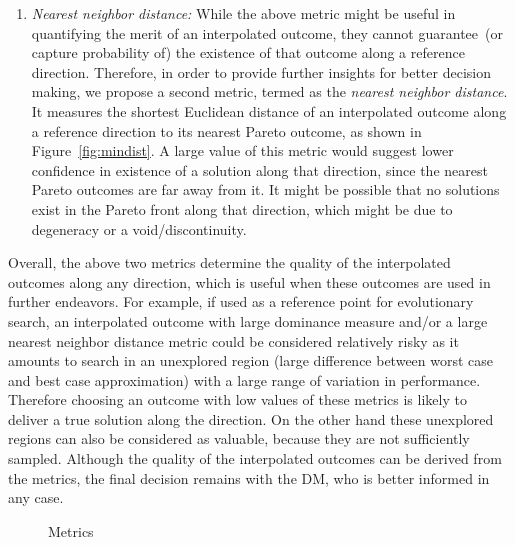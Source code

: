 {\begin{enumerate}
		
		\item \emph{Nearest neighbor distance:} While the above metric might be useful in quantifying the merit of an interpolated outcome, they cannot guarantee~(or capture probability of) the existence of that outcome along a reference direction. Therefore, in order to provide further insights for better decision making, we propose a second metric, termed as the \emph{nearest neighbor distance}. It measures the shortest Euclidean distance of an interpolated outcome along a reference direction to its nearest Pareto outcome, as shown in Figure~\ref{fig:mindist}. A large value of this metric would suggest lower confidence in existence of a solution along that direction, since the nearest Pareto outcomes are far away from it. It might be possible that no solutions exist in the Pareto front along that direction, which might be due to {\color{blue}degeneracy or a void/discontinuity}. 
	\end{enumerate}
}

Overall, the above two metrics determine the quality of the interpolated outcomes along any direction, which is useful when these outcomes are used in further endeavors. For example, if used as a reference point for evolutionary search, an interpolated outcome with large dominance measure and/or a large nearest neighbor distance metric could be considered relatively risky as it amounts to search in an unexplored region {\color{blue}(large difference between worst case and best case approximation)} with a large range of variation in performance. Therefore choosing an outcome with low values of these metrics is likely to deliver a true solution along the direction. {\color{blue}On the other hand these unexplored regions can also be considered as valuable, because they are not sufficiently sampled. Although the quality of the interpolated outcomes can be derived from the metrics, the final decision remains with the DM, who is better informed in any case.} 


\begin{figure*}[!ht]
	\centering
	\caption{Metrics}
	\label{fig:metric}
\end{figure*}


